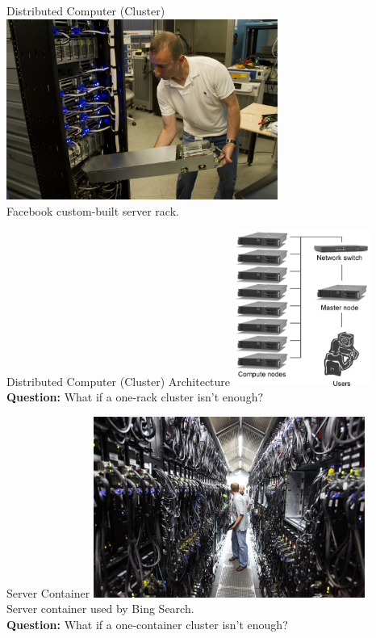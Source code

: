 \documentclass[serif,xcolor=pdftex,dvipsnames,table,hyperref={bookmarks=false,breaklinks}]{beamer}
\begin{document}
\begin{frame}[t]{Distributed Computer (Cluster)}
\center
\includegraphics[width=3.5in]{../Figures/openrack2.jpg}\\[12pt]
Facebook custom-built server rack.
\end{frame}

\begin{frame}[t]{Distributed Computer (Cluster) Architecture}
\center
\includegraphics[height=2in]{../Figures/hpc_cluster.png}\\[12pt]
\pause \textbf{Question:} What if a one-rack cluster isn't enough?
\end{frame}


\begin{frame}[t]{Server Container}
\center
\includegraphics[width=3.5in]{../Figures/bing_container.jpg}\\
Server container used by Bing Search.\\
\pause\textbf{Question:} What if a one-container cluster isn't enough?
\end{frame}
\end{document}
